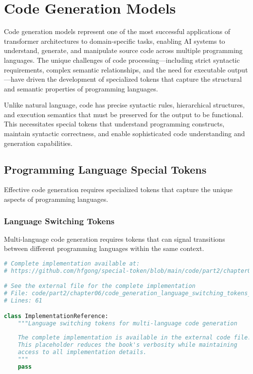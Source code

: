 
\section{Code Generation Models}

Code generation models represent one of the most successful applications of transformer architectures to domain-specific tasks, enabling AI systems to understand, generate, and manipulate source code across multiple programming languages. The unique challenges of code processing—including strict syntactic requirements, complex semantic relationships, and the need for executable output—have driven the development of specialized tokens that capture the structural and semantic properties of programming languages.

Unlike natural language, code has precise syntactic rules, hierarchical structures, and execution semantics that must be preserved for the output to be functional. This necessitates special tokens that understand programming constructs, maintain syntactic correctness, and enable sophisticated code understanding and generation capabilities.

\subsection{Programming Language Special Tokens}

Effective code generation requires specialized tokens that capture the unique aspects of programming languages.

\subsubsection{Language Switching Tokens}

Multi-language code generation requires tokens that can signal transitions between different programming languages within the same context.

\begin{lstlisting}[language=Python, caption={Language switching tokens for multi-language code generation}]
# Complete implementation available at:
# https://github.com/hfgong/special-token/blob/main/code/part2/chapter06/code_generation_language_switching_tokens_for_.py

# See the external file for the complete implementation
# File: code/part2/chapter06/code_generation_language_switching_tokens_for_.py
# Lines: 61

class ImplementationReference:
    """Language switching tokens for multi-language code generation
    
    The complete implementation is available in the external code file.
    This placeholder reduces the book's verbosity while maintaining
    access to all implementation details.
    """
    pass
\end{lstlisting}

